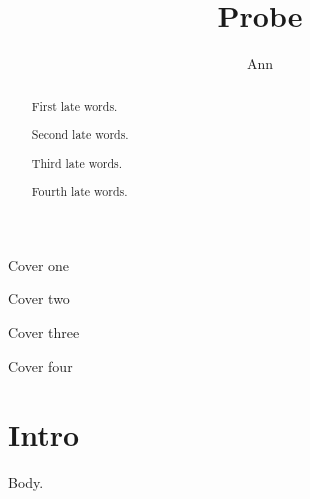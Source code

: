 \documentclass{article}
\begin{document}
\title{Probe}\author{Ann}
\maketitle
\begin{center}Cover one\end{center}
\begin{abstract}First late words.\end{abstract}
\begin{center}Cover two\end{center}
\begin{abstract}Second late words.\end{abstract}
\begin{center}Cover three\end{center}
\begin{abstract}Third late words.\end{abstract}
\begin{center}Cover four\end{center}
\begin{abstract}Fourth late words.\end{abstract}
\section{Intro}
Body.
\end{document}
